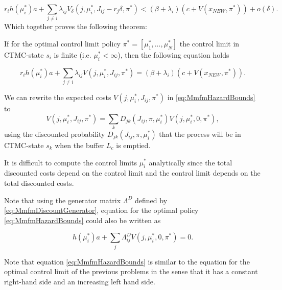 \[
r_ih(\mu_i^*)a+\sum\limits_{j\neq i}\lambda_{ij} V_\delta(j,\mu_i^*,J_{ij}-r_j\delta,\pi^*)<
(\beta+\lambda_i)(c+V(x_{NEW},\pi^*))+o(\delta).
\]
Which together proves the following theorem:
\begin{theorem}
	If for the optimal control limit policy $\pi^*=[\mu_1^*,...,\mu_N^*]$ the control limit in CTMC-state $s_i$ is finite (i.e. $\mu_i^*<\infty$), then the following equation holds 
	
	\begin{equation}\label{eq:MmfmHazardBounds}
	r_ih(\mu_i^*)a+\sum\limits_{j\neq i}\lambda_{ij} V(j,\mu_i^*,J_{ij},\pi^*)=
	(\beta+\lambda_i)(c+V(x_{NEW},\pi^*)).
	\end{equation}
\end{theorem}
\begin{remark}
	We can rewrite the expected costs $V(j,\mu_i^*,J_{ij},\pi^*)$ in \eqref{eq:MmfmHazardBounds} to
	\[
	V(j,\mu_i^*,J_{ij},\pi^*)=\sum\limits_k D_{jk}(J_{ij},\pi,\mu_i^*)V(j,\mu_i^*,0,\pi^*),
	\]
	using the discounted probability $D_{jk}(J_{ij},\pi,\mu_i^*)$ that the process will be in CTMC-state $s_k$ when the buffer $L_c$ is emptied.
\end{remark}

\begin{remark}
	It is difficult to compute the control limits $\mu_i^*$ analytically since the total discounted costs depend on the control limit and the control limit depends on the total discounted costs.
\end{remark}

\begin{remark}
Note that using the generator matrix $\Lambda^D$ defined by \eqref{eq:MmfmDiscountGenerator}, equation for the optimal policy \eqref{eq:MmfmHazardBounds} could also be written as

\begin{equation}\label{eq:MmfmHazardBoundsShort}
h(\mu_i^*)a+\sum\limits_j\Lambda^D_{ij}V(j,\mu_i^*,0,\pi^*)=0.
\end{equation}
\end{remark}

\begin{remark}
Note that equation \eqref{eq:MmfmHazardBounds} is similar to the equation for the optimal control limit of the previous problems in the sense that it has a constant right-hand side and an increasing left hand side.
\end{remark}